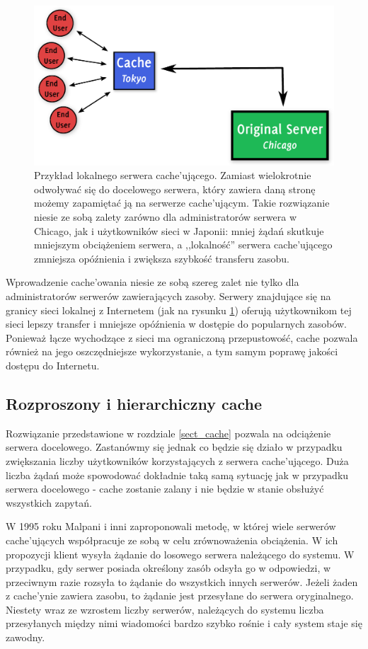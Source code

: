 \documentclass[a4paper,11pt]{scrartcl}
\newcommand{\s}{ }
\newcommand{\kesz}{cache}
\newcommand{\keszy}{cache'y}
\newcommand{\keszujacego}{cache'ującego}
\newcommand{\keszujacym}{cache'ującym}
\newcommand{\keszujacych}{cache'ujących}
\newcommand{\keszowania}{cache'owania}
\begin{document}
\begin{figure}[ht]
\centering
\includegraphics[width=0.85\linewidth]{img/cache.pdf}
\caption{
Przykład lokalnego serwera \keszujacego.
Zamiast wielokrotnie odwoływać się do docelowego serwera, który zawiera daną stronę
możemy zapamiętać ją na serwerze \keszujacym. Takie rozwiązanie niesie ze sobą zalety
zarówno dla administratorów serwera w Chicago, jak i użytkowników sieci w Japonii:
mniej żądań skutkuje mniejszym obciążeniem serwera, a ,,lokalność'' serwera \keszujacego\s zmniejsza opóźnienia i zwiększa szybkość transferu zasobu.
}
\label{fig_cache_server}
\end{figure}

Wprowadzenie \keszowania\s niesie ze sobą szereg zalet nie tylko dla administratorów serwerów zawierających zasoby. Serwery znajdujące się na granicy sieci lokalnej z Internetem (jak na rysunku \ref{fig_cache_server}) oferują użytkownikom tej sieci lepszy transfer i mniejsze opóźnienia w dostępie do popularnych zasobów.
Ponieważ łącze wychodzące z sieci ma ograniczoną przepustowość, \kesz\s pozwala również na jego oszczędniejsze wykorzystanie, a tym samym poprawę jakości dostępu do Internetu.

\subsection{Rozproszony i hierarchiczny \kesz}\label{sect_dist_cache}
Rozwiązanie przedstawione w rozdziale \ref{sect_cache} pozwala na odciążenie serwera docelowego. Zastanówmy się jednak co będzie się działo w przypadku zwiększania liczby użytkowników korzystających z serwera \keszujacego. Duża liczba żądań może spowodować dokładnie taką samą sytuację jak w przypadku serwera docelowego - \kesz\s zostanie zalany i nie będzie w stanie obsłużyć wszystkich zapytań.

W 1995 roku Malpani i inni \cite{malpani1995making} zaproponowali metodę, w której wiele serwerów \keszujacych\s współpracuje ze sobą w celu zrównoważenia obciążenia. W ich propozycji klient wysyła żądanie do losowego serwera należącego do systemu. W przypadku, gdy serwer posiada określony zasób odsyła go w odpowiedzi, w przeciwnym razie rozsyła to żądanie do wszystkich innych serwerów. Jeżeli żaden z \keszy nie zawiera zasobu, to żądanie jest przesyłane do serwera oryginalnego. Niestety wraz ze wzrostem liczby serwerów, należących do systemu liczba przesyłanych między nimi wiadomości bardzo szybko rośnie i cały system staje się zawodny.
\end{document}
